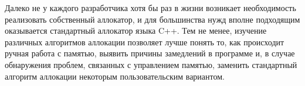 Далеко не у каждого разработчика хотя бы раз в жизни возникает необходимость реализовать собственный аллокатор, и для большинства нужд вполне подходящим оказывается стандартный аллокатор языка C++. Тем не менее, изучение различных алгоритмов аллокации позволяет лучше понять то, как происходит ручная работа с памятью, выявить причины замедлений в программе и, в случае обнаружения проблем, связанных с управлением памятью, заменить стандартный алгоритм аллокации некоторым пользовательским вариантом.
